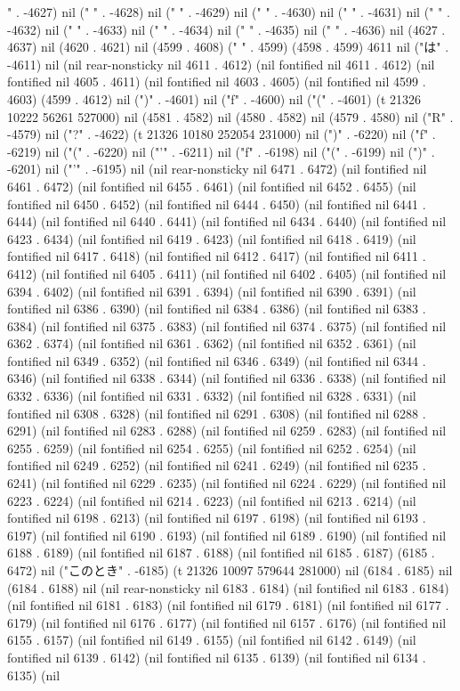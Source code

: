 " . -4627) nil (" " . -4628) nil (" " . -4629) nil (" " . -4630) nil (" " . -4631) nil (" " . -4632) nil (" " . -4633) nil (" " . -4634) nil (" " . -4635) nil (" " . -4636) nil (4627 . 4637) nil (4620 . 4621) nil (4599 . 4608) (" " . 4599) (4598 . 4599) 4611 nil ("は" . -4611) nil (nil rear-nonsticky nil 4611 . 4612) (nil fontified nil 4611 . 4612) (nil fontified nil 4605 . 4611) (nil fontified nil 4603 . 4605) (nil fontified nil 4599 . 4603) (4599 . 4612) nil (")" . -4601) nil ("f" . -4600) nil ("(" . -4601) (t 21326 10222 56261 527000) nil (4581 . 4582) nil (4580 . 4582) nil (4579 . 4580) nil ("R" . -4579) nil ("?" . -4622) (t 21326 10180 252054 231000) nil (")" . -6220) nil ("f" . -6219) nil ("(" . -6220) nil ("'" . -6211) nil ("f" . -6198) nil ("(" . -6199) nil (")" . -6201) nil ("'" . -6195) nil (nil rear-nonsticky nil 6471 . 6472) (nil fontified nil 6461 . 6472) (nil fontified nil 6455 . 6461) (nil fontified nil 6452 . 6455) (nil fontified nil 6450 . 6452) (nil fontified nil 6444 . 6450) (nil fontified nil 6441 . 6444) (nil fontified nil 6440 . 6441) (nil fontified nil 6434 . 6440) (nil fontified nil 6423 . 6434) (nil fontified nil 6419 . 6423) (nil fontified nil 6418 . 6419) (nil fontified nil 6417 . 6418) (nil fontified nil 6412 . 6417) (nil fontified nil 6411 . 6412) (nil fontified nil 6405 . 6411) (nil fontified nil 6402 . 6405) (nil fontified nil 6394 . 6402) (nil fontified nil 6391 . 6394) (nil fontified nil 6390 . 6391) (nil fontified nil 6386 . 6390) (nil fontified nil 6384 . 6386) (nil fontified nil 6383 . 6384) (nil fontified nil 6375 . 6383) (nil fontified nil 6374 . 6375) (nil fontified nil 6362 . 6374) (nil fontified nil 6361 . 6362) (nil fontified nil 6352 . 6361) (nil fontified nil 6349 . 6352) (nil fontified nil 6346 . 6349) (nil fontified nil 6344 . 6346) (nil fontified nil 6338 . 6344) (nil fontified nil 6336 . 6338) (nil fontified nil 6332 . 6336) (nil fontified nil 6331 . 6332) (nil fontified nil 6328 . 6331) (nil fontified nil 6308 . 6328) (nil fontified nil 6291 . 6308) (nil fontified nil 6288 . 6291) (nil fontified nil 6283 . 6288) (nil fontified nil 6259 . 6283) (nil fontified nil 6255 . 6259) (nil fontified nil 6254 . 6255) (nil fontified nil 6252 . 6254) (nil fontified nil 6249 . 6252) (nil fontified nil 6241 . 6249) (nil fontified nil 6235 . 6241) (nil fontified nil 6229 . 6235) (nil fontified nil 6224 . 6229) (nil fontified nil 6223 . 6224) (nil fontified nil 6214 . 6223) (nil fontified nil 6213 . 6214) (nil fontified nil 6198 . 6213) (nil fontified nil 6197 . 6198) (nil fontified nil 6193 . 6197) (nil fontified nil 6190 . 6193) (nil fontified nil 6189 . 6190) (nil fontified nil 6188 . 6189) (nil fontified nil 6187 . 6188) (nil fontified nil 6185 . 6187) (6185 . 6472) nil ("このとき" . -6185) (t 21326 10097 579644 281000) nil (6184 . 6185) nil (6184 . 6188) nil (nil rear-nonsticky nil 6183 . 6184) (nil fontified nil 6183 . 6184) (nil fontified nil 6181 . 6183) (nil fontified nil 6179 . 6181) (nil fontified nil 6177 . 6179) (nil fontified nil 6176 . 6177) (nil fontified nil 6157 . 6176) (nil fontified nil 6155 . 6157) (nil fontified nil 6149 . 6155) (nil fontified nil 6142 . 6149) (nil fontified nil 6139 . 6142) (nil fontified nil 6135 . 6139) (nil fontified nil 6134 . 6135) (nil 